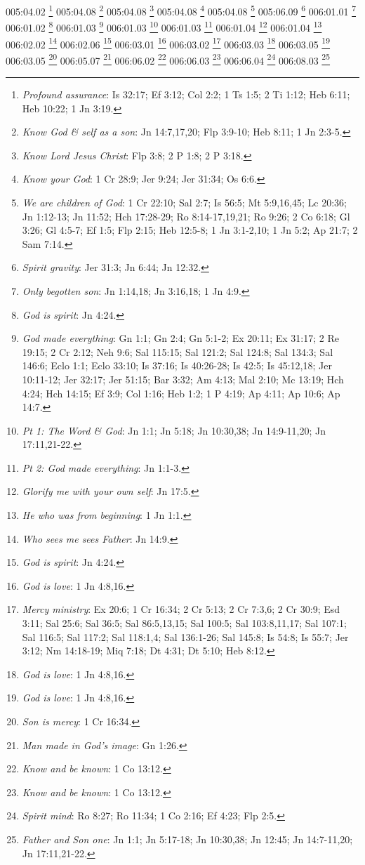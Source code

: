 {{{{{{{{{{{{{{005:04.02 \footnote{\textit{Profound assurance}: Is 32:17; Ef 3:12; Col 2:2; 1 Ts 1:5; 2 Ti 1:12; Heb 6:11; Heb 10:22; 1 Jn 3:19.}
005:04.08 \footnote{\textit{Know God & self as a son}: Jn 14:7,17,20; Flp 3:9-10; Heb 8:11; 1 Jn 2:3-5.}
005:04.08 \footnote{\textit{Know Lord Jesus Christ}: Flp 3:8; 2 P 1:8; 2 P 3:18.}
005:04.08 \footnote{\textit{Know your God}: 1 Cr 28:9; Jer 9:24; Jer 31:34; Os 6:6.}
005:04.08 \footnote{\textit{We are children of God}: 1 Cr 22:10; Sal 2:7; Is 56:5; Mt 5:9,16,45; Lc 20:36; Jn 1:12-13; Jn 11:52; Hch 17:28-29; Ro 8:14-17,19,21; Ro 9:26; 2 Co 6:18; Gl 3:26; Gl 4:5-7; Ef 1:5; Flp 2:15; Heb 12:5-8; 1 Jn 3:1-2,10; 1 Jn 5:2; Ap 21:7; 2 Sam 7:14.}
005:06.09 \footnote{\textit{Spirit gravity}: Jer 31:3; Jn 6:44; Jn 12:32.}
006:01.01 \footnote{\textit{Only begotten son}: Jn 1:14,18; Jn 3:16,18; 1 Jn 4:9.}
006:01.02 \footnote{\textit{God is spirit}: Jn 4:24.}
006:01.03 \footnote{\textit{God made everything}: Gn 1:1; Gn 2:4; Gn 5:1-2; Ex 20:11; Ex 31:17; 2 Re 19:15; 2 Cr 2:12; Neh 9:6; Sal 115:15; Sal 121:2; Sal 124:8; Sal 134:3; Sal 146:6; Eclo 1:1; Eclo 33:10; Is 37:16; Is 40:26-28; Is 42:5; Is 45:12,18; Jer 10:11-12; Jer 32:17; Jer 51:15; Bar 3:32; Am 4:13; Mal 2:10; Mc 13:19; Hch 4:24; Hch 14:15; Ef 3:9; Col 1:16; Heb 1:2; 1 P 4:19; Ap 4:11; Ap 10:6; Ap 14:7.}
006:01.03 \footnote{\textit{Pt 1: The Word & God}: Jn 1:1; Jn 5:18; Jn 10:30,38; Jn 14:9-11,20; Jn 17:11,21-22.}
006:01.03 \footnote{\textit{Pt 2: God made everything}: Jn 1:1-3.}
006:01.04 \footnote{\textit{Glorify me with your own self}: Jn 17:5.}
006:01.04 \footnote{\textit{He who was from beginning}: 1 Jn 1:1.}
006:02.02 \footnote{\textit{Who sees me sees Father}: Jn 14:9.}
006:02.06 \footnote{\textit{God is spirit}: Jn 4:24.}
006:03.01 \footnote{\textit{God is love}: 1 Jn 4:8,16.}
006:03.02 \footnote{\textit{Mercy ministry}: Ex 20:6; 1 Cr 16:34; 2 Cr 5:13; 2 Cr 7:3,6; 2 Cr 30:9; Esd 3:11; Sal 25:6; Sal 36:5; Sal 86:5,13,15; Sal 100:5; Sal 103:8,11,17; Sal 107:1; Sal 116:5; Sal 117:2; Sal 118:1,4; Sal 136:1-26; Sal 145:8; Is 54:8; Is 55:7; Jer 3:12; Nm 14:18-19; Miq 7:18; Dt 4:31; Dt 5:10; Heb 8:12.}
006:03.03 \footnote{\textit{God is love}: 1 Jn 4:8,16.}
006:03.05 \footnote{\textit{God is love}: 1 Jn 4:8,16.}
006:03.05 \footnote{\textit{Son is mercy}: 1 Cr 16:34.}
006:05.07 \footnote{\textit{Man made in God's image}: Gn 1:26.}
006:06.02 \footnote{\textit{Know and be known}: 1 Co 13:12.}
006:06.03 \footnote{\textit{Know and be known}: 1 Co 13:12.}
006:06.04 \footnote{\textit{Spirit mind}: Ro 8:27; Ro 11:34; 1 Co 2:16; Ef 4:23; Flp 2:5.}
006:08.03 \footnote{\textit{Father and Son one}: Jn 1:1; Jn 5:17-18; Jn 10:30,38; Jn 12:45; Jn 14:7-11,20; Jn 17:11,21-22.}
}}}}}}}}}}}}}}
